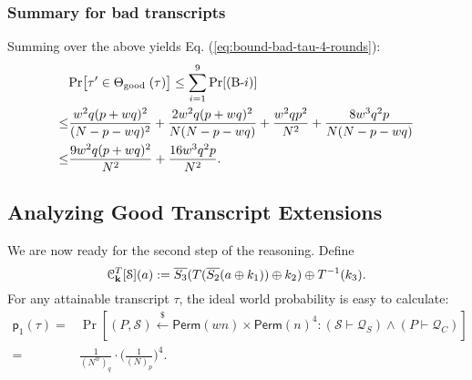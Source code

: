 \subsubsection{Summary for bad transcripts}


Summing over the above yields Eq. (\ref{eq:bound-bad-tau-4-rounds}):
%
\begin{align*}
&  {\Pr}\big[ \tau' \in \Theta_{\text {good }}(\tau)\big]  \leq \sum_{i=1}^{9}\Pr[\text{(B-}i)]       \\
\leq  & \frac{w^2 q (p+w q)^{2}}{(N-p-wq)^{2}}+
\frac{2w^2 q (p+w q)^{2}}{N  (N-p-wq)}+
\frac{w^2qp^2}{N^2}+
\frac{8w^3q^2p}{N(N-p-wq)}      \\
\leq  & \frac{9w^2 q (p+w q)^{2}}{N^2}+ \frac{16w^3q^2p}{N^2} .
\end{align*}
%








\subsection{Analyzing Good Transcript Extensions}
\label{sec:good-tau-4-rounds}

We are now ready for the second step of the reasoning. Define
%
$$\mathcal{C}_{\mathbf{k}}^T[\mathcal{S}](a):=   \overline{S_3}(T(\overline{S_2}(a\oplus k_1))\oplus k_2)\oplus T^{-1}(k_3).$$
%
For any attainable transcript $\tau$, the ideal world probability is easy to calculate:
%
%
\begin{align*}
\mathsf{p}_{1}(\tau)=&\operatorname{Pr}\left[(P,\mathcal{S})\stackrel{\$}{\leftarrow} {\mathsf{Perm}}(wn)\times\mathsf{Perm}(n)^4: (\mathcal{S} \vdash \mathcal{Q}_{S}) \wedge(P \vdash \mathcal{Q}_{C})  \right]		\\
=&\frac{1}{(N^w)_q}\cdot\bigg(\frac{1}{(N)_p}\bigg)^4.
\end{align*}




